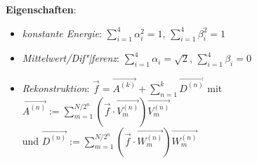 \linie

\textbf{Eigenschaften}:
\begin{itemize}
    \item
    \emph{konstante Energie}:
    $\sum_{i=1}^4 \alpha_i^2 = 1$,
    $\sum_{i=1}^4 \beta_i^2 = 1$

    \item
    \emph{Mittelwert/Dif"|ferenz}:
    $\sum_{i=1}^4 \alpha_i = \sqrt{2}$,
    $\sum_{i=1}^4 \beta_i = 0$

    \item
    \emph{Rekonstruktion}:
    $\vec{f} = \vec{A^{(k)}} + \sum_{n=1}^k \vec{D^{(n)}}$
    mit $\vec{A^{(n)}} := \sum_{m=1}^{N/2^n} (\vec{f} \cdot \vec{V_m^{(n)}}) \vec{V_m^{(n)}}$\\
    und $\vec{D^{(n)}} := \sum_{m=1}^{N/2^n} (\vec{f} \cdot \vec{W_m^{(n)}}) \vec{W_m^{(n)}}$
\end{itemize}

\pagebreak
